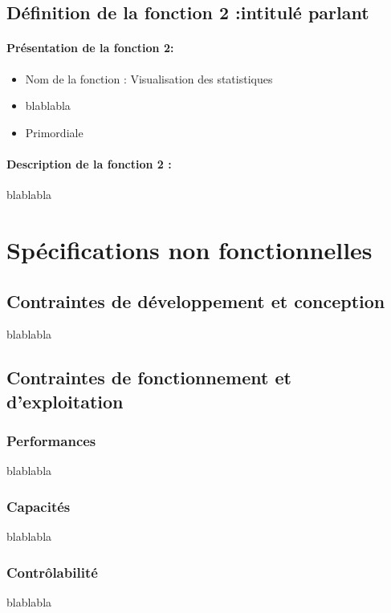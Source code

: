 \documentclass{polytech/polytech}
\numberwithin{figure}{chapter}
\begin{document}
\begin{appendix}
\subsection{Définition de la fonction 2 :intitulé parlant}

\paragraph{Présentation de la fonction 2:}

\begin{itemize}
    \item Nom de la fonction : Visualisation des statistiques
    \item blablabla
    \item Primordiale
\end{itemize}

\paragraph{Description de la fonction 2 :}

blablabla


\section{Spécifications non fonctionnelles}

\subsection{Contraintes de développement et conception}

blablabla

\subsection{Contraintes de fonctionnement et d’exploitation}

\subsubsection{Performances}
blablabla

\subsubsection{Capacités}
blablabla

\subsubsection{Contrôlabilité}
blablabla


\end{appendix}
\end{document}
